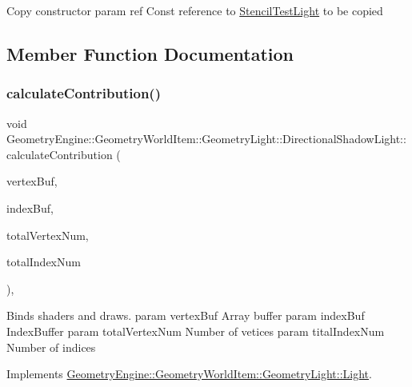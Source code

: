 Copy constructor param ref Const reference to \mbox{\hyperlink{class_geometry_engine_1_1_geometry_world_item_1_1_geometry_light_1_1_stencil_test_light}{Stencil\+Test\+Light}} to be copied 

\subsection{Member Function Documentation}
\mbox{\label{class_geometry_engine_1_1_geometry_world_item_1_1_geometry_light_1_1_directional_shadow_light_a712d0b0a0573ebd246a4a8aa6b2b667a}} 
\subsubsection{\texorpdfstring{calculateContribution()}{calculateContribution()}}
{\footnotesize\ttfamily void Geometry\+Engine\+::\+Geometry\+World\+Item\+::\+Geometry\+Light\+::\+Directional\+Shadow\+Light\+::calculate\+Contribution (\begin{DoxyParamCaption}\item[{Q\+Open\+G\+L\+Buffer $\ast$}]{vertex\+Buf,  }\item[{Q\+Open\+G\+L\+Buffer $\ast$}]{index\+Buf,  }\item[{unsigned int}]{total\+Vertex\+Num,  }\item[{unsigned int}]{total\+Index\+Num }\end{DoxyParamCaption})\hspace{0.3cm}{\ttfamily [protected]}, {\ttfamily [virtual]}}

Binds shaders and draws. param vertex\+Buf Array buffer param index\+Buf Index\+Buffer param total\+Vertex\+Num Number of vetices param tital\+Index\+Num Number of indices 

Implements \mbox{\hyperlink{class_geometry_engine_1_1_geometry_world_item_1_1_geometry_light_1_1_light_a58aa2a3520f7aa2b03afcb4123e7530a}{Geometry\+Engine\+::\+Geometry\+World\+Item\+::\+Geometry\+Light\+::\+Light}}.

